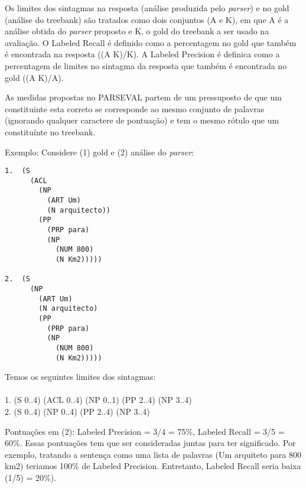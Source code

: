 Os limites dos sintagmas na resposta (análise produzida pelo \emph{parser}) e no gold (análise do treebank) são tratados como dois conjuntos (A e K), em que A é a análise obtida do \emph{parser} proposto e K, o gold do treebank a ser usado na avaliação. O Labeled Recall
é definido como a percentagem no gold que também é encontrada na resposta ((A K)/K). A Labeled Precision é definica como a percentagem de limites no sintagma da resposta que também é encontrada no gold ((A K)/A).

As medidas propostas no PARSEVAL partem de um pressuposto de que um constituinte esta correto se corresponde ao mesmo conjunto de palavras (ignorando qualquer caractere de pontuação) e tem o mesmo rótulo que um constituínte no treebank.

Exemplo: Considere (1) gold e (2) análise do \emph{parser}:

\begin{center}
\footnotesize
\begin{verbatim}
1.  (S
      (ACL
        (NP
          (ART Um)
          (N arquitecto))
        (PP
          (PRP para)
          (NP
            (NUM 800)
            (N Km2)))))

2.  (S
      (NP
        (ART Um)
        (N arquitecto)
        (PP
          (PRP para)
          (NP
            (NUM 800)
            (N Km2)))))
\end{verbatim}
\end{center}

Temos os seguintes limites dos sintagmas:\\ \\
1. (S 0..4) (ACL 0..4) (NP 0..1) (PP 2..4) (NP 3..4)\\
2. (S 0..4) (NP 0..4) (PP 2..4) (NP 3..4)

Pontuações em (2): Labeled Precision = 3/4 = 75{\%}, Labeled Recall = 3/5 = 60{\%}. Essas pontuações tem que ser consideradas juntas para ter significado. 
Por exemplo, tratando a sentença como uma lista de palavras (Um arquiteto para 800 km2) teriamos 100{\%} de Labeled Precision. Entretanto, Labeled Recall seria baixa (1/5) = 20{\%}).
